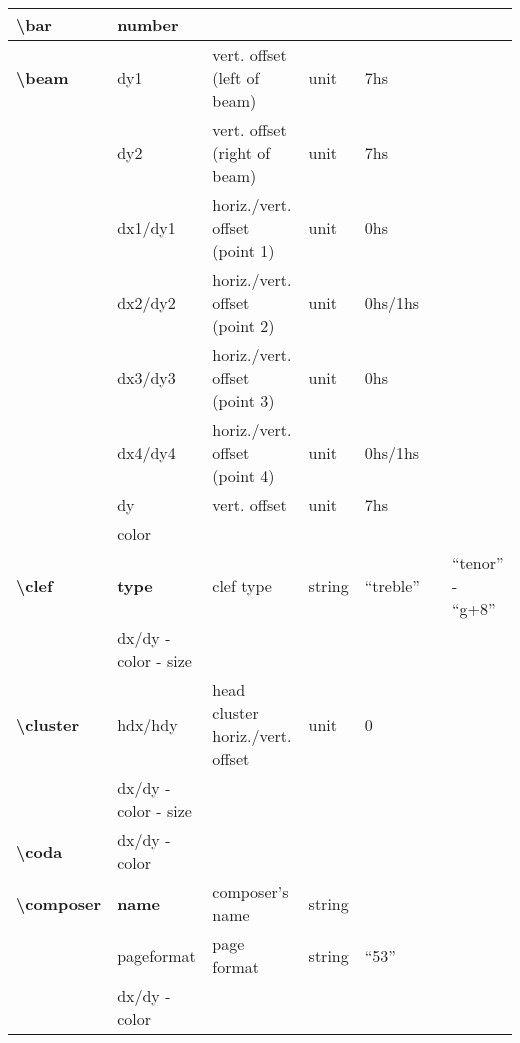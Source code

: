 \documentclass[a4paper, landscape, 10pt]{article}
\begin{document}
\begin{tabularx}{\linewidth}{p{3cm}p{3cm}p{6cm}p{2.5cm}p{2.5cm}p{3.5cm}p{3.5cm}}
    \textbf{\textbackslash{}bar}&number&&&&&\\ %
    \hline
    \textbf{\textbackslash{}beam}&dy1&vert. offset (left of beam)&unit&7hs&&\\
    &dy2&vert. offset (right of beam)&unit&7hs&&\\
    &dx1/dy1&horiz./vert. offset (point 1)&unit&0hs&&\\
    &dx2/dy2&horiz./vert. offset (point 2)&unit&0hs/1hs&&\\
    &dx3/dy3&horiz./vert. offset (point 3)&unit&0hs&&\\
    &dx4/dy4&horiz./vert. offset (point 4)&unit&0hs/1hs&&\\
    &dy&vert. offset&unit&7hs&&\\
    &color&&&&&\\
    \hline
    \textbf{\textbackslash{}clef}&\textbf{type}&clef type&string&``treble''&&``tenor'' - ``g+8''\\
    &dx/dy - color - size&&&&&\\
    \hline
    \textbf{\textbackslash{}cluster}&hdx/hdy&head cluster horiz./vert. offset&unit&0&&\\
    &dx/dy - color - size&&&&&\\
    \hline
    \textbf{\textbackslash{}coda}&dx/dy - color&&&&&\\
    \hline
    \textbf{\textbackslash{}composer}&\textbf{name}&composer's name&string&&&\\
    &pageformat&page format&string&``53''&&\\ %
    &dx/dy - color&&&&&\\
    \hline
\end{tabularx}
\end{document}
